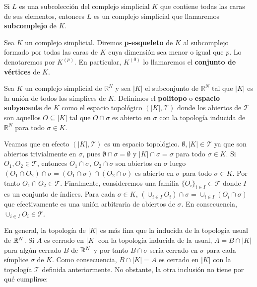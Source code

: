 \begin{definicion}
	Si $L$ es una subcolección del complejo simplicial $K$ que contiene todas las caras
	de sus elementos, entonces $L$ es un complejo simplicial que llamaremos
	\textbf{subcomplejo} de $K$.
\end{definicion}
\begin{definicion}
	Sea $K$ un complejo simplicial. Diremos \textbf{p-esqueleto} de $K$ al subcomplejo
	formado por todas las caras de $K$ cuya dimensión sea menor o igual que $p$.
	Lo denotaremos por $K^{(p)}$. En particular, $K^{(0)}$ lo llamaremos el
	\textbf{conjunto de vértices} de $K$.
\end{definicion}
\begin{definicion}
	Sea $K$ un complejo simplicial de $\mathbb{R}^{N}$ y sea $|K|$ el subconjunto de
	$\mathbb{R}^{N}$ tal que $|K|$ es la unión de todos los símplices de $K$.
	Definimos el \textbf{politopo} o \textbf{espacio subyacente} de $K$ como el
	espacio topológico $(|K|, \mathcal{T})$ donde los abiertos de $\mathcal{T}$
	son aquellos $O \subseteq |K|$ tal que $O \cap \sigma$ es abierto en $\sigma$
	con la topología inducida de $\mathbb{R}^{N}$ para todo $\sigma \in K$.
\end{definicion}

Veamos que en efecto $(|K|, \mathcal{T})$ es un espacio topológico. $\emptyset, |
K| \in \mathcal{T}$ ya que son abiertos trivialmente en $\sigma$, pues
$\emptyset \cap \sigma = \emptyset$ y $|K| \cap \sigma = \sigma$ para todo
$\sigma \in K$. Si $O_{1}, O_{2}\in \mathcal{T}$, entonces $O_{1}\cap \sigma$, $O
_{2}\cap \sigma$ son abiertos en $\sigma$ luego $(O_{1}\cap O_{2}) \cap \sigma =
(O_{1}\cap \sigma) \cap (O_{2}\cap \sigma)$ es abierto en $\sigma$ para todo $\sigma
\in K$. Por tanto $O_{1}\cap O_{2}\in \mathcal{T}$. Finalmente, consideremos una
familia $\{O_{i}\}_{i \in I}\subset \mathcal{T}$ donde $I$ es un conjunto de
índices. Para cada $\sigma \in K$,
$(\cup_{i \in I}O_{i}) \cap \sigma = \cup_{i \in I}(O_{i}\cap \sigma)$ que
efectivamente es una unión arbitraria de abiertos de $\sigma$. En consecuencia,
$\cup_{i \in I}O_{i}\in \mathcal{T}$.

En general, la topología de $|K|$ es más fina que la inducida de la topología usual
de $\mathbb{R}^{N}$. Si $A$ es cerrado en $|K|$ con la topología inducida de la usual, $A
=B \cap |K|$ para algún cerrado $B$ de $\mathbb{R}^{N}$ y por tanto $B \cap \sigma$ sería
cerrado en $\sigma$ para cada símplice $\sigma$ de $K$. Como consecuencia, $B \cap
|K|=A$ es cerrado en $|K|$ con la topología $\mathcal{T}$ definida anteriormente.
No obstante, la otra inclusión no tiene por qué cumplirse:

